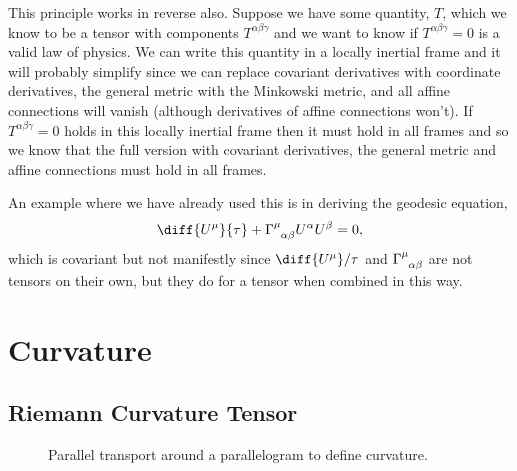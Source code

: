\documentclass[fleqn]{NotesClass}
\newcommand*{\christoffel}[3]{\tensor{\Gamma}{^{#1}_{{#2}{#3}}}}
\begin{document}
    This principle works in reverse also.
    Suppose we have some quantity, \(T\), which we know to be a tensor with components \(T^{\alpha\beta\gamma}\) and we want to know if \(T^{\alpha\beta\gamma} = 0\) is a valid law of physics.
    We can write this quantity in a locally inertial frame and it will probably simplify since we can replace covariant derivatives with coordinate derivatives, the general metric with the Minkowski metric, and all affine connections will vanish (although derivatives of affine connections won't).
    If \(T^{\alpha\beta\gamma} = 0\) holds in this locally inertial frame then it must hold in all frames and so we know that the full version with covariant derivatives, the general metric and affine connections must hold in all frames.
    
    An example where we have already used this is in deriving the geodesic equation,\vspace{-2.5ex}
    \begin{equation}
        \diff{U^\mu}{\tau} + \christoffel{\mu}{\alpha}{\beta} U^\alpha U^\beta = 0,
    \end{equation}
    which is covariant but not manifestly since \(\diff{U^\mu}/{\tau}\) and \(\christoffel{\mu}{\alpha}{\beta}\) are not tensors on their own, but they do for a tensor when combined in this way.
    
    \chapter{Curvature}
    \section{Riemann Curvature Tensor}
    \begin{figure}
        \caption{Parallel transport around a parallelogram to define curvature.}
        \label{fig:parallel transport}
    \end{figure}
    
\end{document}
